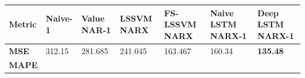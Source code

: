 \documentclass[11pt]{article}
\begin{document}
    \begin{longtable}[]{@{}lllllll@{}}
\toprule
\begin{minipage}[b]{0.12\columnwidth}\raggedright
Metric\strut
\end{minipage} & \begin{minipage}[b]{0.12\columnwidth}\raggedright
Naive-1\strut
\end{minipage} & \begin{minipage}[b]{0.12\columnwidth}\raggedright
Value NAR-1\strut
\end{minipage} & \begin{minipage}[b]{0.12\columnwidth}\raggedright
LSSVM NARX\strut
\end{minipage} & \begin{minipage}[b]{0.12\columnwidth}\raggedright
FS-LSSVM NARX\strut
\end{minipage} & \begin{minipage}[b]{0.12\columnwidth}\raggedright
Naive LSTM NARX-1\strut
\end{minipage} & \begin{minipage}[b]{0.12\columnwidth}\raggedright
Deep LSTM NARX-1\strut
\end{minipage}\tabularnewline
\midrule
\endhead
\begin{minipage}[t]{0.12\columnwidth}\raggedright
\textbf{MSE}\strut
\end{minipage} & \begin{minipage}[t]{0.12\columnwidth}\raggedright
312.15\strut
\end{minipage} & \begin{minipage}[t]{0.12\columnwidth}\raggedright
281.685\strut
\end{minipage} & \begin{minipage}[t]{0.12\columnwidth}\raggedright
241.045\strut
\end{minipage} & \begin{minipage}[t]{0.12\columnwidth}\raggedright
163.467\strut
\end{minipage} & \begin{minipage}[t]{0.12\columnwidth}\raggedright
160.34\strut
\end{minipage} & \begin{minipage}[t]{0.12\columnwidth}\raggedright
\textbf{135.48}\strut
\end{minipage}\tabularnewline
\begin{minipage}[t]{0.12\columnwidth}\raggedright
\textbf{MAPE}\strut
\end{minipage} & \begin{minipage}[t]{0.12\columnwidth}\raggedright

\end{minipage}
\end{longtable}
\end{document}
